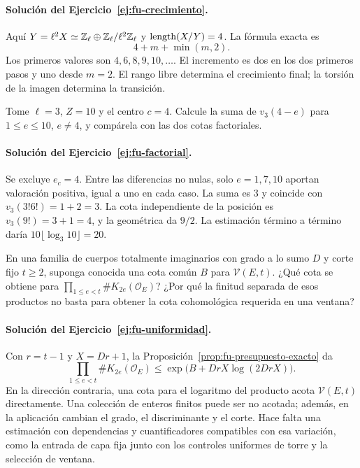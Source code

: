 \paragraph{Solución del Ejercicio~\ref{ej:fu-crecimiento}.}
Aquí $Y=\ell^2X\simeq\mathbb{Z}_\ell\oplus\mathbb{Z}_\ell/\ell^2\mathbb{Z}_\ell$
y $\operatorname{length}(X/Y)=4$. La fórmula exacta es
\[
 4+m+\min(m,2).
\]
Los primeros valores son $4,6,8,9,10,\ldots$.
El incremento es dos en los dos primeros pasos y uno
desde $m=2$. El rango libre determina el crecimiento final;
la torsión de la imagen determina la transición.

\begin{ejercicio}\label{ej:fu-factorial}
Tome $\ell=3$, $Z=10$ y el centro $c=4$.
Calcule la suma de $v_3(4-e)$ para $1\le e\le10$, $e\ne4$,
y compárela con las dos cotas factoriales.
\end{ejercicio}

\paragraph{Solución del Ejercicio~\ref{ej:fu-factorial}.}
Se excluye $e_c=4$. Entre las diferencias no nulas, solo
$e=1,7,10$ aportan valoración positiva, igual a uno en
cada caso. La suma es $3$ y coincide con
$v_3(3!6!)=1+2=3$. La cota independiente de la posición es
$v_3(9!)=3+1=4$, y la geométrica da $9/2$.
La estimación término a término daría
$10\lfloor\log_3 10\rfloor=20$.

\begin{ejercicio}\label{ej:fu-uniformidad}
En una familia de cuerpos totalmente imaginarios con grado
a lo sumo $D$ y corte fijo $t\ge2$, suponga conocida una
cota común $B$ para $\mathcal V(E,t)$.
¿Qué cota se obtiene para
$\prod_{1\le e<t}\#K_{2e}(\mathcal O_E)$?
¿Por qué la finitud separada de esos productos no basta
para obtener la cota cohomológica requerida en una ventana?
\end{ejercicio}

\paragraph{Solución del Ejercicio~\ref{ej:fu-uniformidad}.}
Con $r=t-1$ y $X=Dr+1$, la Proposición~\ref{prop:fu-presupuesto-exacto}
da
\[
 \prod_{1\le e<t}\#K_{2e}(\mathcal O_E)
 \le\exp\bigl(B+DrX\log(2DrX)\bigr).
\]
En la dirección contraria, una cota para el logaritmo del
producto acota $\mathcal V(E,t)$ directamente.
Una colección de enteros finitos puede ser no acotada;
además, en la aplicación cambian el grado, el discriminante
y el corte. Hace falta una estimación con dependencias y
cuantificadores compatibles con esa variación, como la
entrada de capa fija junto con los controles uniformes
de torre y la selección de ventana.
